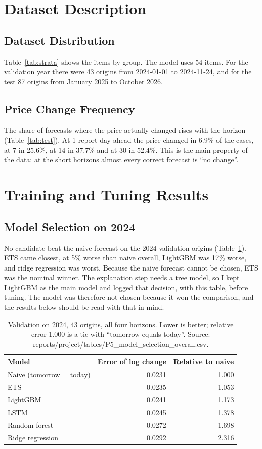 \documentclass[12pt]{report}
\begin{document}
\section{Dataset Description}

\subsection{Dataset Distribution}
Table~\ref{tab:strata} shows the items by group. The model uses 54 items. For the validation year there were 43 origins from 2024-01-01 to 2024-11-24, and for the test 87 origins from January 2025 to October 2026.

\subsection{Price Change Frequency}
The share of forecasts where the price actually changed rises with the horizon (Table~\ref{tab:test}). At 1 report day ahead the price changed in 6.9\% of the cases, at 7 in 25.6\%, at 14 in 37.7\% and at 30 in 52.4\%. This is the main property of the data: at the short horizons almost every correct forecast is ``no change''.

\section{Training and Tuning Results}

\subsection{Model Selection on 2024}
No candidate beat the naive forecast on the 2024 validation origins (Table~\ref{tab:select}). ETS came closest, at 5\% worse than naive overall, LightGBM was 17\% worse, and ridge regression was worst. Because the naive forecast cannot be chosen, ETS was the nominal winner. The explanation step needs a tree model, so I kept LightGBM as the main model and logged that decision, with this table, before tuning. The model was therefore not chosen because it won the comparison, and the results below should be read with that in mind.

\begin{table}[H]\centering\small
\caption{Validation on 2024, 43 origins, all four horizons. Lower is better; relative error 1.000 is a tie with ``tomorrow equals today''. Source: reports/project/tables/P5\_model\_selection\_overall.csv.}\label{tab:select}
\begin{tabular}{|l|r|r|}
\hline
\textbf{Model} & \textbf{Error of log change} & \textbf{Relative to naive} \\
\hline
Naive (tomorrow = today) & 0.0231 & 1.000 \\
\hline
ETS & 0.0235 & 1.053 \\
\hline
LightGBM & 0.0241 & 1.173 \\
\hline
LSTM & 0.0245 & 1.378 \\
\hline
Random forest & 0.0272 & 1.698 \\
\hline
Ridge regression & 0.0292 & 2.316 \\
\hline
\end{tabular}
\end{table}
\end{document}
